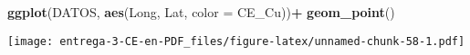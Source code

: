 \documentclass[
]{article}
\newenvironment{Shaded}{\begin{snugshade}}{\end{snugshade}}
\newcommand{\DataTypeTok}[1]{\textcolor[rgb]{0.13,0.29,0.53}{#1}}
\newcommand{\DecValTok}[1]{\textcolor[rgb]{0.00,0.00,0.81}{#1}}
\newcommand{\KeywordTok}[1]{\textcolor[rgb]{0.13,0.29,0.53}{\textbf{#1}}}
\newcommand{\NormalTok}[1]{#1}
\newcommand{\OperatorTok}[1]{\textcolor[rgb]{0.81,0.36,0.00}{\textbf{#1}}}
\newcommand{\StringTok}[1]{\textcolor[rgb]{0.31,0.60,0.02}{#1}}
\begin{document}
\begin{Shaded}
\begin{Highlighting}[]
\KeywordTok{ggplot}\NormalTok{(DATOS, }\KeywordTok{aes}\NormalTok{(Long, Lat, }\DataTypeTok{color =}\NormalTok{ CE_Cu))}\OperatorTok{+}
\StringTok{  }\KeywordTok{geom_point}\NormalTok{()}
\end{Highlighting}
\end{Shaded}

\texttt{[image: entrega-3-CE-en-PDF\_files/figure-latex/unnamed-chunk-58-1.pdf]}

\begin{Shaded}
\end{Shaded}
\end{document}

